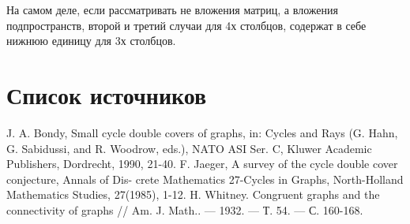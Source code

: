 \documentclass[a4paper]{article}
\theoremstyle{definition}
\begin{document}
На самом деле, если рассматривать не вложения матриц, а вложения подпространств, второй и третий случаи для 4х столбцов, содержат в себе нижнюю единицу для 3х столбцов.








\newpage

\section{Список источников}

\begin{thebibliography}{3}
	\bibitem{}
	J. A. Bondy, Small cycle double covers of graphs, in: Cycles and Rays (G. Hahn, G. Sabidussi, and R. Woodrow,
	eds.), NATO ASI Ser. C, Kluwer Academic Publishers, Dordrecht, 1990, 21-40.
	F. Jaeger, A survey of the cycle double cover conjecture, Annals of Dis-
	crete Mathematics 27-Cycles in Graphs, North-Holland Mathematics Studies,
	27(1985), 1-12.
	H. Whitney. Congruent graphs and the connectivity of graphs // Am. J. Math.. — 1932. — Т. 54. — С. 160-168.
\end{thebibliography}
\end{document}
